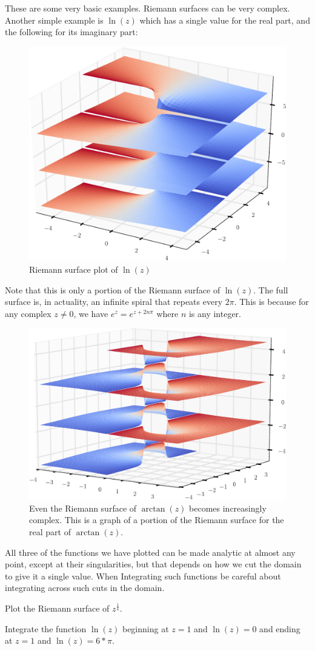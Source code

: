 These are some very basic examples.
Riemann surfaces can be very complex.
Another simple example is $\ln(z)$ which has a single value for the real part, and the following for its imaginary part:
\begin{figure}[h]
\includegraphics[width=\textwidth]{RiemannSurface3}
\caption{Riemann surface plot of $\ln(z)$}
\end{figure}
Note that this is only a portion of the Riemann surface of $\ln(z)$.
The full surface is, in actuality, an infinite spiral that repeats every $2\pi$.
This is because for any complex $z\neq 0$, we have $e^z=e^{z+2n\pi}$ where $n$ is any integer.
\begin{figure}[h]
\includegraphics[width=\textwidth]{RiemannSurface4.pdf}
\caption{Even the Riemann surface of $\arctan(z)$ becomes increasingly complex.
This is a graph of a portion of the Riemann surface for the real part of $\arctan(z)$.}
\end{figure}
All three of the functions we have plotted can be made analytic at almost any point, except at their singularities, but that depends on how we cut the domain to give it a single value.
When Integrating such functions be careful about integrating across such cuts in the domain.

\begin{problem}
Plot the Riemann surface of $z^{\frac{1}{4}}$.
\end{problem}

\begin{problem}
Integrate the function $\ln(z)$ beginning at $z=1$ and $\ln(z)=0$ and ending at $z=1$ and $\ln(z)=6*\pi$.
\end{problem}